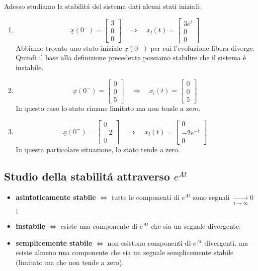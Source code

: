 \documentclass[../main.tex]{subfiles}
\begin{document}
		Adesso studiamo la stabilit\'a del sistema dati alcuni stati iniziali:
		\begin{enumerate}
			\item
				\[ \underline x(0^-) = \begin{bmatrix} 3\\ 0\\ 0 \end{bmatrix} \quad \Rightarrow \quad x_l(t) = \begin{bmatrix} 3e^t\\ 0\\ 0 \end{bmatrix} \]
				Abbiamo trovato uno stato iniziale $ \underline x(0^-) $ per cui l'evoluzione libera diverge. Quindi il base alla definizione precedente possiamo stabilire che il sistema \'e instabile.
			\item
				\[ \underline x(0^-) = \begin{bmatrix} 0\\ 0\\ 5 \end{bmatrix} \quad \Rightarrow \quad x_l(t) = \begin{bmatrix} 0\\ 0\\ 5 \end{bmatrix} \]
				In questo caso lo stato rimane limitato ma non tende a zero.
			\item
				\[ \underline x(0^-) = \begin{bmatrix} 0\\ -2\\ 0 \end{bmatrix} \quad \Rightarrow \quad x_l(t) = \begin{bmatrix} 0\\ -2e^{-t}\\ 0 \end{bmatrix} \]
				In questa particolare situazione, lo stato tende a zero.                
		\end{enumerate}                                                           
	                                                                           
	\subsection{Studio della stabilit\'a attraverso $ e^{At} $}       
		\begin{itemize}                                                           
			\item                                                                    
				\textbf{asintoticamente stabile} $ \Leftrightarrow $ tutte le componenti di $ e^{At} $ sono segnali $ \xrightarrow[t \rightarrow \infty]{} 0 $;
			\item
				\textbf{instabile} $ \Leftrightarrow $ esiste una componente di $ e^{At} $ che sia un segnale divergente;
			\item
				\textbf{semplicemente stabile} $ \Leftrightarrow $ non esistono componenti di $ e^{At} $ divergenti, ma esiste almeno una componente che sia un segnale semplicemente stabile (limitato ma che non tende a zero).
		\end{itemize}
		
\end{document}
